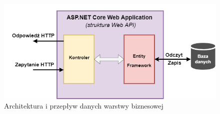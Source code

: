     \begin{figure}[ht]
	\centering
	\includegraphics[width=1\linewidth]{graphics/chapter-3/asp-net-web-api-architecture.png}
	\caption{Architektura i przepływ danych warstwy biznesowej}
	\label{fig:asp-net-web-api-architecture}
    \end{figure}

